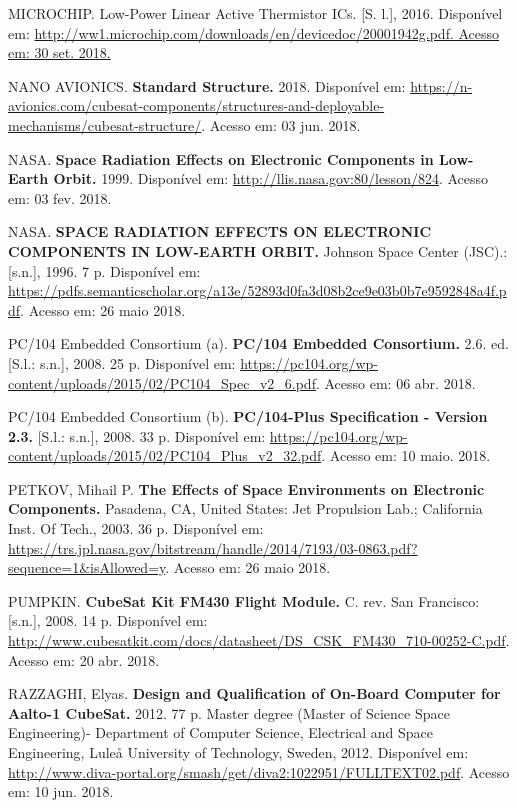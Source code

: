 \noindent MICROCHIP. Low-Power Linear Active Thermistor ICs. [S. l.], 2016. Disponível em: \url{http://ww1.microchip.com/downloads/en/devicedoc/20001942g.pdf. Acesso em: 30 set. 2018.}

\noindent NANO AVIONICS. \textbf{Standard Structure. } 2018. Disponível em: \url{https://n-avionics.com/cubesat-components/structures-and-deployable-mechanisms/cubesat-structure/}. Acesso em: 03 jun. 2018.

\noindent NASA. \textbf{Space Radiation Effects on Electronic Components in Low-Earth Orbit. } 1999. Disponível em: \url{http://llis.nasa.gov:80/lesson/824}. Acesso em: 03 fev. 2018.

\noindent NASA. \textbf{SPACE RADIATION EFFECTS ON ELECTRONIC COMPONENTS IN LOW-EARTH ORBIT. } Johnson Space Center (JSC).: [s.n.], 1996. 7 p. Disponível em: \url{https://pdfs.semanticscholar.org/a13e/52893d0fa3d08b2ce9e03b0b7e9592848a4f.pdf}. Acesso em: 26 maio 2018.

\noindent PC/104 Embedded Consortium (a). \textbf{PC/104 Embedded Consortium. }2.6. ed. [S.l.: s.n.], 2008. 25 p. Disponível em: \url{https://pc104.org/wp-content/uploads/2015/02/PC104_Spec_v2_6.pdf}. Acesso em: 06 abr. 2018.

\noindent PC/104 Embedded Consortium (b). \textbf{PC/104-Plus Specification - Version 2.3. } [S.l.: s.n.], 2008. 33 p. Disponível em: \url{https://pc104.org/wp-content/uploads/2015/02/PC104_Plus_v2_32.pdf}. Acesso em: 10 maio. 2018.

\noindent PETKOV, Mihail P. \textbf{The Effects of Space Environments on Electronic Components. } Pasadena, CA, United States: Jet Propulsion Lab.; California Inst. Of Tech., 2003. 36 p. Disponível em: \url{https://trs.jpl.nasa.gov/bitstream/handle/2014/7193/03-0863.pdf?sequence=1&isAllowed=y}. Acesso em: 26 maio 2018.

\noindent PUMPKIN. \textbf{CubeSat Kit FM430 Flight Module.} C. rev. San Francisco: [s.n.], 2008. 14 p. Disponível em: \url{http://www.cubesatkit.com/docs/datasheet/DS_CSK_FM430_710-00252-C.pdf}. Acesso em: 20 abr. 2018.

\noindent RAZZAGHI, Elyas. \textbf{Design and Qualification of On-Board Computer for Aalto-1 CubeSat.} 2012. 77 p. Master degree (Master of Science Space Engineering)- Department of Computer Science, Electrical and Space Engineering, Luleå University of Technology, Sweden, 2012. Disponível em: \url{http://www.diva-portal.org/smash/get/diva2:1022951/FULLTEXT02.pdf}. Acesso em: 10 jun. 2018.

